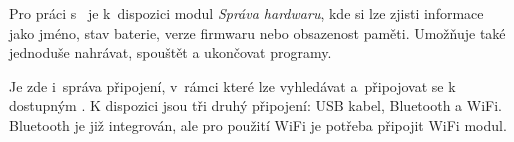 Pro práci s~ je k~dispozici modul {\it Správa hardwaru}, kde si lze zjisti informace jako jméno, stav baterie, verze firmwaru nebo obsazenost paměti. 
Umožňuje také jednoduše nahrávat, spouštět a ukončovat programy. 

Je zde i~správa připojení, v~rámci které lze vyhledávat a~připojovat se k dostupným . 
% 
% 
% 
% 
%
%
%
%
K dispozici jsou tři druhý připojení: USB kabel, Bluetooth a WiFi. Bluetooth je již integrován, ale pro použití WiFi je potřeba připojit WiFi modul.

